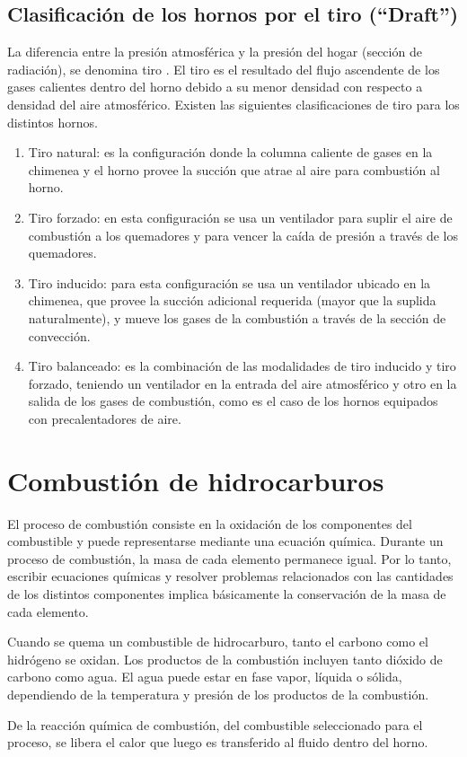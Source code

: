 \subsection{Clasificación de los hornos por el tiro (``Draft'')}
\par La diferencia entre la presión atmosférica y la presión del hogar (sección de radiación), se denomina tiro \cite{bib:draft}. El tiro es el resultado del flujo ascendente de los gases calientes dentro del horno debido a su menor densidad con respecto a densidad del aire atmosférico. Existen las siguientes clasificaciones de tiro para los distintos hornos.
\begin{enumerate}
    \item Tiro natural: es la configuración donde la columna caliente de gases en la chimenea y el horno provee la succión que atrae al aire para combustión al horno.
    \item Tiro forzado: en esta configuración se usa un ventilador para suplir el aire de combustión a los quemadores y para vencer la caída de presión a través de los quemadores.
    \item Tiro inducido: para esta configuración se usa un ventilador ubicado en la chimenea, que provee la succión adicional requerida (mayor que la suplida naturalmente), y mueve los gases de la combustión a través de la sección de convección.
    \item Tiro balanceado: es la combinación de las modalidades de tiro inducido y tiro forzado, teniendo un ventilador en la entrada del aire atmosférico y otro en la salida de los gases de combustión, como es el caso de los hornos equipados con precalentadores de aire.
\end{enumerate}

\section{Combustión de hidrocarburos}

\par El proceso de combustión consiste en la oxidación de los componentes del combustible y puede representarse mediante una ecuación química. Durante un proceso de combustión, la masa de cada elemento permanece igual. Por lo tanto, escribir ecuaciones químicas y resolver problemas relacionados con las cantidades de los distintos componentes implica básicamente la conservación de la masa de cada elemento. 
\par Cuando se quema un combustible de hidrocarburo, tanto el carbono como el hidrógeno se oxidan. Los productos de la combustión incluyen tanto dióxido de carbono como agua. El agua puede estar en fase vapor, líquida o sólida, dependiendo de la temperatura y presión de los productos de la combustión.
\par De la reacción química de combustión, del combustible seleccionado para el proceso, se libera el calor que luego es transferido al fluido dentro del horno.

